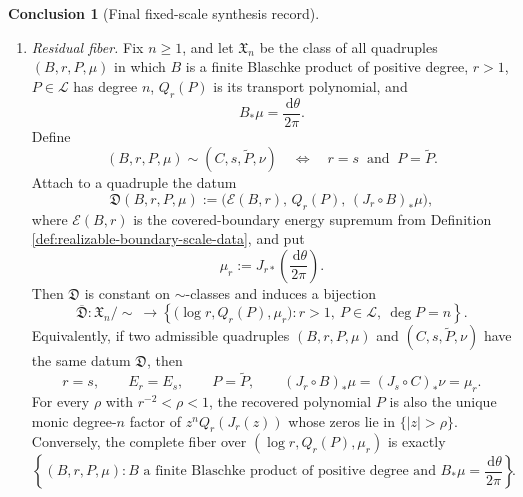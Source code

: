 \documentclass[12pt,a4paper]{article}
\theoremstyle{plain}
\theoremstyle{definition}
\newtheorem{conclusion}[theorem]{Conclusion}
\numberwithin{equation}{section}
\newcommand{\dd}{\,\mathrm{d}}
\begin{document}
\begin{conclusion}[Final fixed-scale synthesis record]
\begin{enumerate}[label=\textup{(\alph*)},leftmargin=*]
\item \emph{Residual fiber.}
Fix \(n\ge1\), and let \(\mathfrak X_n\) be the class of all quadruples
\((B,r,P,\mu)\) in which \(B\) is a finite Blaschke product of positive
degree, \(r>1\), \(P\in\mathcal L\) has degree \(n\), \(Q_r(P)\) is its
transport polynomial, and
\[
B_\ast\mu=\frac{\dd\theta}{2\pi}.
\]
Define
\[
(B,r,P,\mu)\sim(C,s,\widetilde P,\nu)
\quad\Longleftrightarrow\quad
r=s\ \text{ and }\ P=\widetilde P.
\]
Attach to a quadruple the datum
\[
\mathfrak D(B,r,P,\mu):=\bigl(\mathcal E(B,r),\,Q_r(P),\,(J_r\circ B)_\ast\mu\bigr),
\]
where \(\mathcal E(B,r)\) is the covered-boundary energy supremum from Definition \ref{def:realizable-boundary-scale-data}, and put
\[
\mu_r:=J_{r\ast}\!\left(\frac{\dd\theta}{2\pi}\right).
\]
Then \(\mathfrak D\) is constant on \(\sim\)-classes and induces a
bijection
\[
\overline{\mathfrak D}:\mathfrak X_n/\!\sim\ \longrightarrow
\left\{\bigl(\log r,Q_r(P),\mu_r\bigr): r>1,
\ P\in\mathcal L,
\ \deg P=n\right\}.
\]
Equivalently, if two admissible quadruples \((B,r,P,\mu)\) and \((C,s,\widetilde P,\nu)\) have the same datum \(\mathfrak D\), then
\[
r=s,
\qquad
E_r=E_s,
\qquad
P=\widetilde P,
\qquad
(J_r\circ B)_\ast\mu=(J_s\circ C)_\ast\nu=\mu_r.
\]
For every \(\rho\) with \(r^{-2}<\rho<1\), the recovered polynomial \(P\) is also the unique monic degree-\(n\) factor of \(z^nQ_r(J_r(z))\) whose zeros lie in \(\{|z|>\rho\}\).  Conversely, the complete fiber over \((\log r,Q_r(P),\mu_r)\) is exactly
\[
\left\{(B,r,P,\mu): B\text{ a finite Blaschke product of positive degree and }
B_\ast\mu=\frac{\dd\theta}{2\pi}\right\}.
\]
\end{enumerate}
\end{conclusion}
\end{document}
